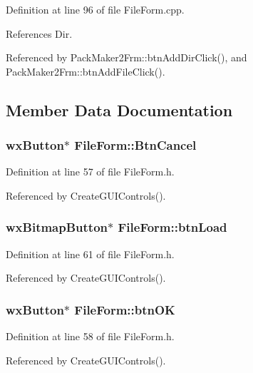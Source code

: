 Definition at line 96 of file File\-Form.cpp.

References Dir.

Referenced by Pack\-Maker2Frm::btn\-Add\-Dir\-Click(), and Pack\-Maker2Frm::btn\-Add\-File\-Click().

\subsection{Member Data Documentation}
\subsubsection{\setlength{\rightskip}{0pt plus 5cm}wx\-Button$\ast$ {\bf File\-Form::Btn\-Cancel}\hspace{0.3cm}{\tt  [private]}}\label{class_file_form_f23289647edc50f214439ad3aee18790}




Definition at line 57 of file File\-Form.h.

Referenced by Create\-GUIControls().
\subsubsection{\setlength{\rightskip}{0pt plus 5cm}wx\-Bitmap\-Button$\ast$ {\bf File\-Form::btn\-Load}\hspace{0.3cm}{\tt  [private]}}\label{class_file_form_f0866483ee106236f158a197de684aa8}




Definition at line 61 of file File\-Form.h.

Referenced by Create\-GUIControls().
\subsubsection{\setlength{\rightskip}{0pt plus 5cm}wx\-Button$\ast$ {\bf File\-Form::btn\-OK}\hspace{0.3cm}{\tt  [private]}}\label{class_file_form_4bfcfbdeb0ebcf39f881d8944f3341b4}




Definition at line 58 of file File\-Form.h.

Referenced by Create\-GUIControls().
